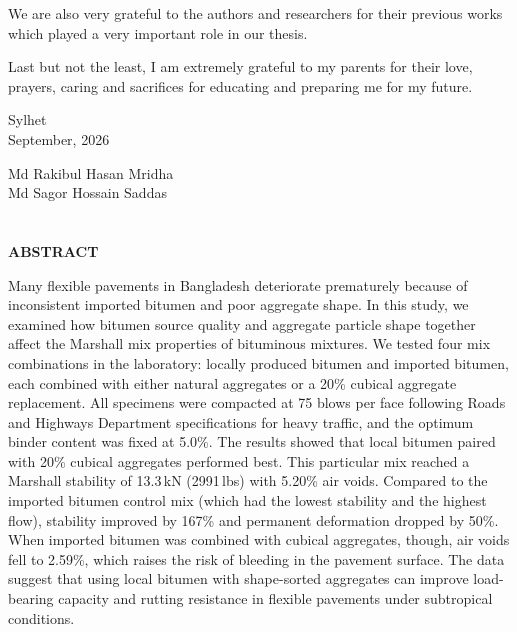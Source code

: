 \documentclass[12pt,a4paper]{article}
\makeatletter
\renewcommand\tableofcontents{%
    \section*{\centering\contentsname}%
    \@starttoc{toc}%
}
\renewcommand\listoffigures{%
    \section*{\centering\listfigurename}%
    \@starttoc{lof}%
}
\renewcommand\listoftables{%
    \section*{\centering\listtablename}%
    \@starttoc{lot}%
}
\makeatother
\begin{document}
We are also very grateful to the authors and researchers for their previous works which played a very important role in our thesis.

Last but not the least, I am extremely grateful to my parents for their love, prayers, caring and sacrifices for educating and preparing me for my future.

\vspace{2cm}

\noindent
\begin{minipage}[t]{0.45\textwidth}
Sylhet\\
September, 2026
\end{minipage}
\hfill
\begin{minipage}[t]{0.45\textwidth}
    Md Rakibul Hasan Mridha\\
    Md Sagor Hossain Saddas
\end{minipage}

\newpage
\tableofcontents
\newpage
{}
{}
\listoffigures
\newpage
{}
{}
\listoftables

\newpage
{}
{}
\begin{center}
    \textbf{\Large ABSTRACT}
\end{center}
\begin{singlespace}
\noindent Many flexible pavements in Bangladesh deteriorate prematurely because of inconsistent imported bitumen and poor aggregate shape. In this study, we examined how bitumen source quality and aggregate particle shape together affect the Marshall mix properties of bituminous mixtures. We tested four mix combinations in the laboratory: locally produced bitumen and imported bitumen, each combined with either natural aggregates or a 20\% cubical aggregate replacement. All specimens were compacted at 75 blows per face following Roads and Highways Department specifications for heavy traffic, and the optimum binder content was fixed at 5.0\%. The results showed that local bitumen paired with 20\% cubical aggregates performed best. This particular mix reached a Marshall stability of 13.3\,kN (2991\,lbs) with 5.20\% air voids. Compared to the imported bitumen control mix (which had the lowest stability and the highest flow), stability improved by 167\% and permanent deformation dropped by 50\%. When imported bitumen was combined with cubical aggregates, though, air voids fell to 2.59\%, which raises the risk of bleeding in the pavement surface. The data suggest that using local bitumen with shape-sorted aggregates can improve load-bearing capacity and rutting resistance in flexible pavements under subtropical conditions.
\end{singlespace}
\end{document}
